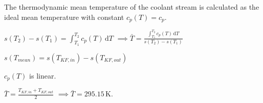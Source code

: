 The thermodynamic mean temperature of the coolant stream is calculated as the ideal mean temperature with constant \( c_p(T) = c_p \).  

\( s(T_2) - s(T_1) = \int_{T_1}^{T_2} c_p(T) \, \text{d}T \)  
\( \implies \bar{T} = \frac{\int_{T_1}^{T_2} c_p(T) \, \text{d}T}{s(T_2) - s(T_1)} \)  

\( s(T_{mean}) = s(T_{KF,in}) - s(T_{KF,out}) \)  

\( c_p(T) \) is linear.  

\( \bar{T} = \frac{T_{KF,in} + T_{KF,out}}{2} \)  
\( \implies \bar{T} = 295.15 \, \text{K} \).